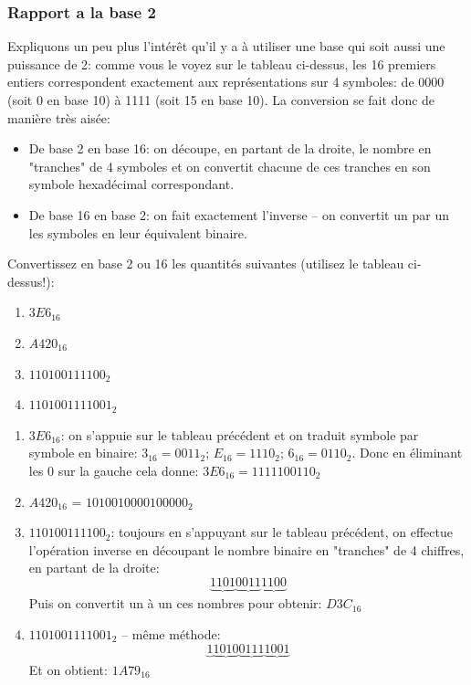 \documentclass[12pt]{article}
\newenvironment{MaReponse}
		{\begin{greyedtextbox}\itshape} %
		{\end{greyedtextbox}}            %
\newenvironment{alphenum}
{\begin{enumerate}[label=\alph*.]}
	{\end{enumerate}}
\begin{document}
	 \subsubsection*{Rapport a la base 2}
	 Expliquons un peu plus l'intérêt qu'il y a à utiliser une base qui soit aussi une puissance de 2: comme vous le voyez sur le tableau ci-dessus, les 16 premiers entiers correspondent exactement aux représentations sur 4 symboles: de 0000 (soit 0 en base 10) à 1111 (soit 15 en base 10). La conversion se fait donc de manière très aisée:
	 \begin{itemize}
	 	\item De base 2 en base 16: on découpe, en partant de la droite, le nombre en "tranches" de 4 symboles et on convertit chacune de ces tranches en son symbole hexadécimal correspondant.
	 	\item De base 16 en base 2: on fait exactement l'inverse -- on convertit un par un les symboles en leur équivalent binaire.
	 \end{itemize}
	 \begin{MonExo}
	 	Convertissez en base 2 ou 16 les quantités suivantes (utilisez le tableau ci-dessus!):
	 	\begin{alphenum}
	 		\item $3E6_{16}$
	 		\item $A420_{16}$
	 		\item $110100111100_2$
	 		\item $1101001111001_2$
	 	\end{alphenum}
	 \end{MonExo}
	 \begin{MaReponse}
		\begin{alphenum}
			\item $3E6_{16}$: on s'appuie sur le tableau précédent et on traduit symbole par symbole en binaire: $3_{16} = 0011_2$;  $E_{16} = 1110_2$; $6_{16} = 0110_2$. Donc en éliminant les 0 sur la gauche cela donne: $3E6_{16} = 1111100110_2$
			\item $A420_{16}$ = $1010010000100000_2$
			\item $110100111100_2$: toujours en s'appuyant sur le tableau précédent, on effectue l'opération inverse en découpant le nombre binaire en "tranches" de 4 chiffres, en partant de la droite:
			\[ \underbrace{1101}_{}\underbrace{0011}_{}\underbrace{1100}_{}\]
			Puis on convertit un à un ces nombres pour obtenir: $D3C_{16}$
			
			\item $1101001111001_2$ -- même méthode:
			\[ \underbrace{1}_{}\underbrace{1010}_{}\underbrace{0111}_{}\underbrace{1001}_{}\]
			Et on obtient: $1A79_{16}$
		\end{alphenum}
	\end{MaReponse}
	 
\end{document}
